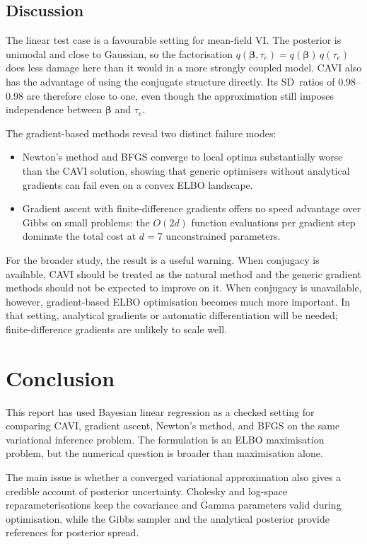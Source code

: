 \documentclass[11pt,a4paper]{article}
\begin{document}
\subsection{Discussion}

The linear test case is a favourable setting for mean-field VI. The posterior is unimodal and close to Gaussian, so the factorisation
$q(\bm{\beta},\tau_e) = q(\bm{\beta})\,q(\tau_e)$ does less damage here than it would in a more strongly coupled model. CAVI also has the advantage of using the conjugate structure directly. Its SD~ratios of 0.98--0.98 are therefore close to one, even though the approximation still imposes independence between $\bm{\beta}$ and $\tau_e$.

The gradient-based methods reveal two distinct failure modes:
\begin{itemize}
  \item Newton's method and BFGS converge to local optima substantially worse than the CAVI solution, showing that generic optimisers without analytical gradients can fail even on a convex ELBO landscape.
  \item Gradient ascent with finite-difference gradients offers no speed advantage over Gibbs on small problems: the $O(2d)$ function evaluations per gradient step dominate the total cost at $d=7$ unconstrained parameters.
\end{itemize}

For the broader study, the result is a useful warning. When conjugacy is available, CAVI should be treated as the natural method and the generic gradient methods should not be expected to improve on it. When conjugacy is unavailable, however, gradient-based ELBO optimisation becomes much more important. In that setting, analytical gradients or automatic differentiation will be needed; finite-difference gradients are unlikely to scale well.

\section{Conclusion}

This report has used Bayesian linear regression as a checked setting for comparing CAVI, gradient ascent, Newton's method, and BFGS on the same variational inference problem. The formulation is an ELBO maximisation problem, but the numerical question is broader than maximisation alone.

The main issue is whether a converged variational approximation also gives a credible account of posterior uncertainty. Cholesky and log-space reparameterisations keep the covariance and Gamma parameters valid during optimisation, while the Gibbs sampler and the analytical posterior provide references for posterior spread.
\end{document}
